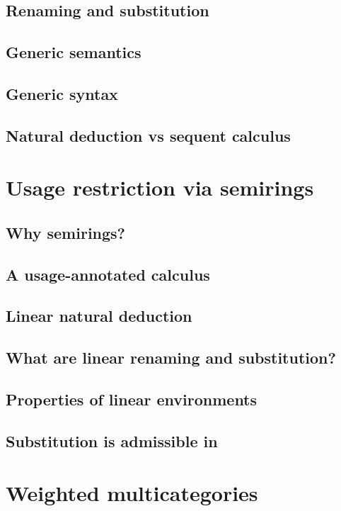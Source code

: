 \documentclass[a4paper,oneside,11pt]{book}
\theoremstyle{definition}
\begin{document}
  \section{Renaming and substitution}\label{sec:kits}
  
  \section{Generic semantics}
  \section{Generic syntax}
  \section{Natural deduction vs sequent calculus}
  

\chapter{Usage restriction via semirings}
  \section{Why semirings?}
  
  \section{A usage-annotated calculus}
  
  \section{Linear natural deduction}
  
  \section{What are linear renaming and substitution?}
  \label{sec:lrkits}
  \section{Properties of linear environments}
  \label{sec:lenv}
  \section{Substitution is admissible in \name{}}
  

\chapter{Weighted multicategories}
\end{document}
